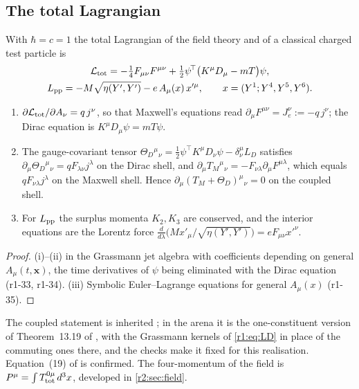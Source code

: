 \subsection{The total Lagrangian}
\label{r1:sec:total}

With $\hbar=c=1$ the total Lagrangian of the field theory and of a classical charged test particle is
\begin{equation}
\label{r1:eq:Ltot}
\begin{gathered}
\mathcal L_{\rm tot}=-\tfrac14F_{\mu\nu}F^{\mu\nu}+\tfrac12\psi^{\!\top}\bigl(K^\mu D_\mu-mT\bigr)\psi,\\
L_{\rm pp}=-M\sqrt{\eta(Y',Y')}-e\,A_\mu(x)\,x'^\mu,\qquad x=(Y^1;Y^4,Y^5,Y^6).
\end{gathered}
\end{equation}

\begin{proposition}
\label{r1:prop:total}
\begin{enumerate}[label=(\roman*),leftmargin=2.2em]
\item $\partial\mathcal L_{\rm tot}/\partial A_\nu=q\,j^\nu$, so that Maxwell's equations read $\partial_\mu F^{\mu\nu}=J_e^\nu:=-q\,j^\nu$;
the Dirac equation is $K^\mu D_\mu\psi=mT\psi$.
\item The gauge-covariant tensor $\Theta_D{}^\mu{}_\nu=\tfrac12\psi^{\!\top}K^\mu D_\nu\psi-\delta^\mu_\nu L_D$ satisfies
$\partial_\mu\Theta_D{}^\mu{}_\nu=qF_{\lambda\nu}j^\lambda$ on the Dirac shell, and $\partial_\mu T_M{}^\mu{}_\nu=-F_{\nu\lambda}\partial_\mu F^{\mu\lambda}$,
which equals $qF_{\nu\lambda}j^\lambda$ on the Maxwell shell. Hence $\partial_\mu(T_M+\Theta_D)^\mu{}_\nu=0$ on the coupled shell.
\item For $L_{\rm pp}$ the surplus momenta $K_2,K_3$ are conserved, and the interior equations are the Lorentz force
$\frac{d}{d\lambda}\bigl(Mx'_\mu/\sqrt{\eta(Y',Y')}\bigr)=eF_{\mu\nu}x'^\nu$.
\end{enumerate}
\end{proposition}

\begin{proof}
(i)--(ii) in the Grassmann jet algebra with coefficients depending on general $A_\mu(t,\mathbf x)$, the time derivatives of $\psi$ being
eliminated with the Dirac equation (r1-33, r1-34). (iii) Symbolic Euler--Lagrange equations for general $A_\mu(x)$ (r1-35).
\end{proof}

The coupled statement is inherited \cite{WeinbergQFT}; in the arena it is the one-constituent version of Theorem~13.19 of \cite{ES17}, with
the Grassmann kernels of \eqref{r1:eq:LD} in place of the commuting ones there, and the checks make it fixed for this realisation. Equation~(19)
of \cite{FMB} is confirmed. The four-momentum of the field is $P^\mu=\int T^{0\mu}_{\rm tot}\,d^3x$, developed in \cref{r2:sec:field}.

